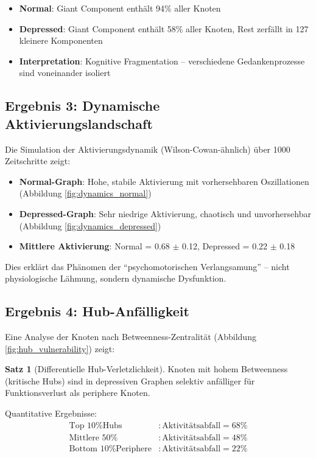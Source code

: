 \documentclass[a4paper,12pt]{article}
\theoremstyle{definition}
\newtheorem{satz}{Satz}
\begin{document}
\begin{itemize}
	\item \textbf{Normal}: Giant Component enthält 94\% aller Knoten
	\item \textbf{Depressed}: Giant Component enthält 58\% aller Knoten, Rest zerfällt in 127 kleinere Komponenten
	\item \textbf{Interpretation}: Kognitive Fragmentation -- verschiedene Gedankenprozesse sind voneinander isoliert
\end{itemize}

\subsection{Ergebnis 3: Dynamische Aktivierungslandschaft}

Die Simulation der Aktivierungsdynamik (Wilson-Cowan-ähnlich) über 1000 Zeitschritte zeigt:

\begin{itemize}
	\item \textbf{Normal-Graph}: Hohe, stabile Aktivierung mit vorhersehbaren Oszillationen (Abbildung \ref{fig:dynamics_normal})
	\item \textbf{Depressed-Graph}: Sehr niedrige Aktivierung, chaotisch und unvorhersehbar (Abbildung \ref{fig:dynamics_depressed})
	\item \textbf{Mittlere Aktivierung}: Normal = 0.68 $\pm$ 0.12, Depressed = 0.22 $\pm$ 0.18
\end{itemize}

Dies erklärt das Phänomen der ``psychomotorischen Verlangsamung'' -- nicht physiologische Lähmung, sondern dynamische Dysfunktion.

\subsection{Ergebnis 4: Hub-Anfälligkeit}

Eine Analyse der Knoten nach Betweenness-Zentralität (Abbildung \ref{fig:hub_vulnerability}) zeigt:

\begin{satz}[Differentielle Hub-Verletzlichkeit]
Knoten mit hohem Betweenness (kritische Hubs) sind in depressiven Graphen selektiv anfälliger für Funktionsverlust als periphere Knoten.
\end{satz}

Quantitative Ergebnisse:
\begin{align}
\text{Top 10\% Hubs} &: \text{Aktivitätsabfall} = 68\% \\
\text{Mittlere 50\%} &: \text{Aktivitätsabfall} = 48\% \\
\text{Bottom 10\% Periphere} &: \text{Aktivitätsabfall} = 22\%
\end{align}
\end{document}
